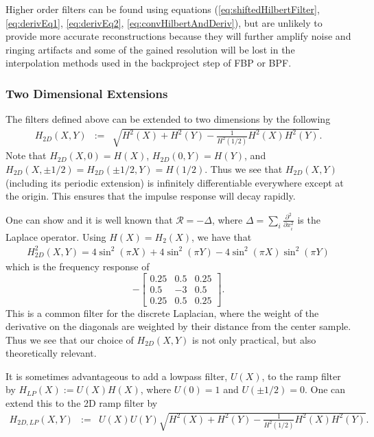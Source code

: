Higher order filters can be found using equations (\ref{eq:shiftedHilbertFilter}, \ref{eq:derivEq1}, \ref{eq:derivEq2}, \ref{eq:convHilbertAndDeriv}), but are unlikely to provide more accurate reconstructions because they will further amplify noise and ringing artifacts and some of the gained resolution will be lost in the interpolation methods used in the backproject step of FBP or BPF.

\subsubsection{Two Dimensional Extensions}

The filters defined above can be extended to two dimensions by the following
\begin{eqnarray}
H_{2D}(X,Y) &:=& \sqrt{H^2(X) + H^2(Y) - \frac{1}{H^2(1/2)}H^2(X)H^2(Y)}.
\end{eqnarray}
Note that $H_{2D}(X,0) = H(X)$, $H_{2D}(0,Y) = H(Y)$, and $H_{2D}(X,\pm 1/2) = H_{2D}(\pm 1/2, Y) = H(1/2)$.  Thus we see that $H_{2D}(X,Y)$ (including its periodic extension) is infinitely differentiable everywhere except at the origin.  This ensures that the impulse response will decay rapidly.

One can show and it is well known that $\mathcal{R} = -\Delta$, where $\Delta = \sum_i \frac{\partial^2}{\partial x_i^2}$ is the Laplace operator.  Using $H(X) = H_2(X)$, we have that
\begin{eqnarray*}
H_{2D}^2(X,Y) = 4\sin^2(\pi X) + 4\sin^2(\pi Y) - 4\sin^2(\pi X)\sin^2(\pi Y)
\end{eqnarray*}
which is the frequency response of $$-\begin{bmatrix} 0.25 & 0.5 & 0.25 \\ 0.5 & -3 & 0.5 \\ 0.25 & 0.5 & 0.25 \end{bmatrix}.$$  This is a common filter for the discrete Laplacian, where the weight of the derivative on the diagonals are weighted by their distance from the center sample.  Thus we see that our choice of $H_{2D}(X,Y)$ is not only practical, but also theoretically relevant.

It is sometimes advantageous to add a lowpass filter, $U(X)$, to the ramp filter by $H_{LP}(X) := U(X)H(X)$, where $U(0) = 1$ and $U(\pm 1/2) = 0$.  One can extend this to the 2D ramp filter by
\begin{eqnarray}
H_{2D,LP}(X,Y) &:=& U(X)U(Y)\sqrt{H^2(X) + H^2(Y) - \frac{1}{H^2(1/2)}H^2(X)H^2(Y)}.
\end{eqnarray}

